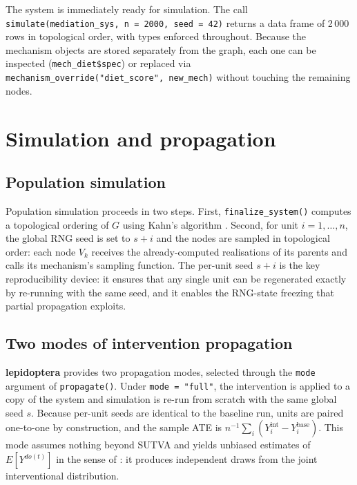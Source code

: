 \documentclass[12pt]{article}
\newcommand{\pkg}[1]{\textbf{#1}}
\newcommand{\code}[1]{\texttt{#1}}
\newcommand{\fct}[1]{\texttt{#1()}}
\begin{document}
\noindent
The system is immediately ready for simulation. The call
\code{simulate(mediation\_sys, n = 2000, seed = 42)} returns a data frame of
2\,000 rows in topological order, with types enforced throughout. Because the
mechanism objects are stored separately from the graph, each one can be inspected
(\code{mech\_diet\$spec}) or replaced via \code{mechanism\_override(\allowbreak"diet\_score",\allowbreak\ new\_mech)} without touching the remaining nodes.

\section{Simulation and propagation}
\label{sec:propagation}

\subsection{Population simulation}

Population simulation proceeds in two steps. First, \fct{finalize\_system}
computes a topological ordering of $G$ using Kahn's algorithm
\citep{kahn1962topological}. Second, for unit $i = 1, \ldots, n$, the global RNG
seed is set to $s + i$ and the nodes are sampled in topological order: each node
$V_k$ receives the already-computed realisations of its parents and calls its
mechanism's sampling function. The per-unit seed $s + i$ is the key reproducibility
device: it ensures that any single unit can be regenerated exactly by re-running
with the same seed, and it enables the RNG-state freezing that partial propagation
exploits.

\subsection{Two modes of intervention propagation}

\pkg{lepidoptera} provides two propagation modes, selected through the
\code{mode} argument of \fct{propagate}. Under \code{mode = "full"}, the
intervention is applied to a copy of the system and simulation is re-run from
scratch with the same global seed $s$. Because per-unit seeds are identical to the
baseline run, units are paired one-to-one by construction, and the sample ATE is
$n^{-1}\sum_i (Y_i^\mathrm{int} - Y_i^\mathrm{base})$. This mode assumes nothing
beyond SUTVA \citep{rubin1980randomization} and yields unbiased estimates of
$E[Y^{do(t)}]$ in the sense of \citet{rubin1974estimating}: it produces independent
draws from the joint interventional distribution.
\end{document}
